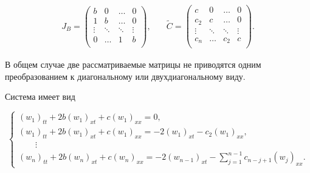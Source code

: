 \begin{equation}

\label{2:J_B}

\begin{array}{cc}

J_B=\left(

  \begin{array}{cccc}

    b & 0 & \ldots & 0 \\

    1 & b & \ldots & 0 \\

    \vdots & \ddots & \ddots & \vdots \\

    0 & \ldots & 1 & b \\

  \end{array}

\right),

\quad &

\widetilde{C}=\left(

    \begin{array}{cccc}

      c & 0 & \ldots & 0 \\

      c_2 & c & \ldots & 0 \\

      \vdots & \ddots & \ddots & \vdots \\

      c_n & \ldots & c_2 & c \\

    \end{array}

\right).

\end{array}

\end{equation}

В общем случае две рассматриваемые матрицы не приводятся одним преобразованием к диагональному или двухдиагональному виду.

Система имеет вид

\begin{equation}

\label{2:sys_JB}

\left\{

  \begin{array}{l}

    (w_1)_{tt}+2b(w_1)_{xt}+c(w_1)_{xx}=0, \\

    (w_1)_{tt}+2b(w_1)_{xt}+c(w_1)_{xx}=-2(w_1)_{xt}-c_2(w_1)_{xx}, \\

    ~~~~~~~~~\vdots \\

    (w_n)_{tt}+2b(w_n)_{xt}+c(w_n)_{xx}=-2(w_{n-1})_{xt}-\sum_{j=1}^{n-1}{c_{n-j+1}({w_j})_{xx}}.

  \end{array}

\right.

\end{equation}

